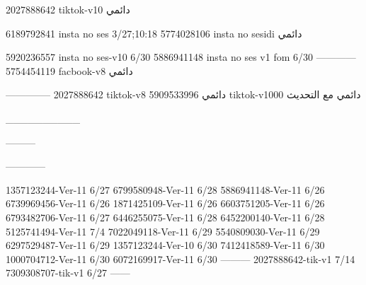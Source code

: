 2027888642 tiktok-v10
دائمي

6189792841 insta no ses
3/27;10:18
5774028106 insta no sesidi
دائمي


5920236557 insta no ses-v10
6/30
5886941148 insta no ses v1 fom
6/30
------------
5754454119 facbook-v8
دائمي


--------------
2027888642 tiktok-v8
دائمي
5909533996 tiktok-v1000
دائمي مع التحديث

__________

---------


------------

1357123244-Ver-11
6/27
6799580948-Ver-11
6/28
5886941148-Ver-11
6/26
6739969456-Ver-11
6/26
1871425109-Ver-11
6/26
6603751205-Ver-11
6/26
6793482706-Ver-11
6/27
6446255075-Ver-11
6/28
6452200140-Ver-11
6/28
5125741494-Ver-11
7/4
7022049118-Ver-11
6/29
5540809030-Ver-11
6/29
6297529487-Ver-11
6/29
1357123244-Ver-10
6/30
7412418589-Ver-11
6/30
1000704712-Ver-11
6/30
6072169917-Ver-11
6/30
---------
2027888642-tik-v1
7/14
7309308707-tik-v1
6/27
------
